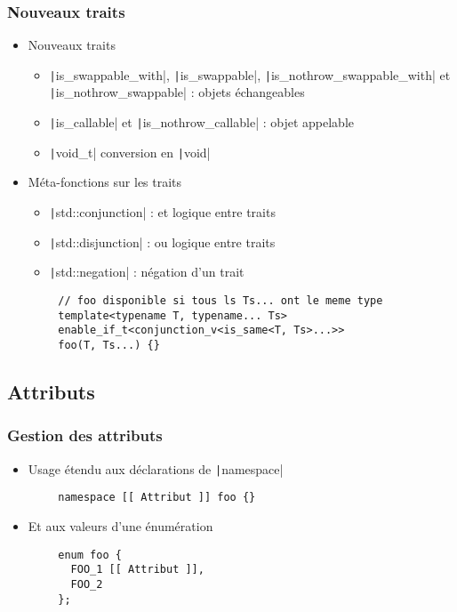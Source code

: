 \documentclass[C++.tex]{subfiles}
\begin{document}
\begin{frame}[fragile]
	\frametitle{Nouveaux traits}
	\begin{itemize}
		\item Nouveaux traits
		\begin{itemize}
			\item \texttt|is_swappable_with|, \texttt|is_swappable|, \texttt|is_nothrow_swappable_with| et \texttt|is_nothrow_swappable| : objets échangeables
			\item \texttt|is_callable| et \texttt|is_nothrow_callable| : objet appelable
			\item \texttt|void_t| conversion en \texttt|void|
		\end{itemize}
		\item Méta-fonctions sur les traits
		\begin{itemize}
			\item \texttt|std::conjunction| : et logique entre traits
			\item \texttt|std::disjunction| : ou logique entre traits
			\item \texttt|std::negation| : négation d'un trait
		\end{itemize}
	\end{itemize}

	\begin{verbatim}
		// foo disponible si tous ls Ts... ont le meme type
		template<typename T, typename... Ts>
		enable_if_t<conjunction_v<is_same<T, Ts>...>>
		foo(T, Ts...) {}
	\end{verbatim}

\end{frame}

\subsection*{Attributs}
\begin{frame}[fragile]
	\frametitle{Gestion des attributs}
	\begin{itemize}
		\item Usage étendu aux déclarations de \texttt|namespace|
	\end{itemize}

	\begin{verbatim}
		namespace [[ Attribut ]] foo {}
	\end{verbatim}

	\begin{itemize}
		\item Et aux valeurs d'une énumération
	\end{itemize}

	\begin{verbatim}
		enum foo {
		  FOO_1 [[ Attribut ]],
		  FOO_2
		};
	\end{verbatim}

\end{frame}
\end{document}
